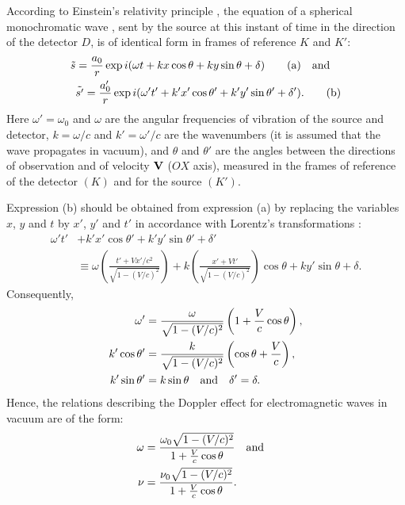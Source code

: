 According to Einstein's relativity principle , the equation of a spherical monochromatic wave , sent by the source at this instant of time in the direction of the detector $D$, is of identical form in frames of reference $K$ and $K'$:
\begin{align*}%
\tilde{s} = \frac{a_{0}}{r} \exp i( \omega t + kx \cos \theta + ky \sin \theta + \delta) \tag{a} \qand \\
\tilde{s'} = \frac{a_{0}'}{r} \exp i( \omega' t' + k'x' \cos \theta' + k'y' \sin \theta' + \delta').\tag{b}
\end{align*}
Here $\omega' = \omega_{0}$ and $\omega$ are the angular frequencies of vibration of the source and detector, $k = \omega/c$ and $k' = \omega'/c$ are the wavenumbers (it is assumed that the wave propagates in vacuum), and $\theta$ and $\theta'$ are the angles between the directions of observation and of velocity $\vb{V}$ ($OX$ axis), measured in the frames
of reference of the detector $(K)$ and for the source $(K')$.

Expression (b) should be obtained from expression (a) by replacing the variables $x$, $y$ and $t$ by $x'$, $y'$ and $t'$ in accordance with Lorentz's transformations :
\begin{align*}
\omega' t' & + k'x' \cos \theta' + k'y' \sin \theta' + \delta' \\
& \equiv \omega \left( \frac{t' + Vx'/c^{2}}{\sqrt{1 - (V/c)^{2}}} \right) 
+ k \left( \frac{x' + Vt'}{\sqrt{1 - (V/c)^{2}}} \right) \cos \theta 
+ k y' \sin \theta + \delta.
\end{align*}
Consequently,
\begin{align*}
\omega' & = \frac{\omega}{\sqrt{1 - (V/c)^{2}}} \left( 1 + \frac{V}{c} \cos \theta \right), \\
k' \cos \theta' & = \frac{k}{\sqrt{1 - (V/c)^{2}}} \left( \cos \theta + \frac{V}{c} \right), \\
k' \sin \theta' & = k \sin \theta \qand \delta' = \delta.
\end{align*}
Hence, the relations describing the Doppler effect for electromagnetic waves in vacuum are of the form:
\begin{align*}
\omega & = \frac{\omega_{0} \sqrt{1 - (V/c)^{2}}}{1 + \frac{V}{c} \cos \theta} \qand \\
\nu & = \frac{\nu_{0} \sqrt{1 - (V/c)^{2}}}{1 + \frac{V}{c} \cos \theta}.
\end{align*}

